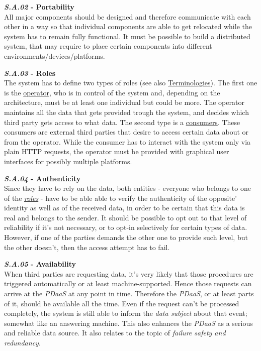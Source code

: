 \documentclass[12pt,english,a4paper,titlepage,cleardoublepage=empty,dottedtoc]{report}
\begin{document}
\textbf{\emph{\protect\hypertarget{sa02}{}{S.A.02}} - Portability}\\
All major components should be designed and therefore communicate with
each other in a way so that individual components are able to get
relocated while the system has to remain fully functional. It must be
possible to build a distributed system, that may require to place
certain components into different environments/devices/platforms.

\textbf{\emph{\protect\hypertarget{sa03}{}{S.A.03}} - Roles}\\
The system has to define two types of roles (see also
\protect\hyperlink{terminologies}{Terminologies}). The first one is the
\protect\hyperlink{terminologies--operator}{operator}, who is in control
of the system and, depending on the architecture, must be at least one
individual but could be more. The operator maintains all the data that
gets provided trough the system, and decides which third party gets
access to what data. The second type is a
\protect\hyperlink{terminologies--consumer}{consumers}. These consumers
are external third parties that desire to access certain data about or
from the operator. While the consumer has to interact with the system
only via plain HTTP requests, the operator must be provided with
graphical user interfaces for possibly multiple platforms.

\textbf{\emph{\protect\hypertarget{sa04}{}{S.A.04}} - Authenticity}\\
Since they have to rely on the data, both entities - everyone who
belongs to one of the \emph{\protect\hyperlink{sa03}{roles}} - have to
be able able to verify the authenticity of the opposite' identity as
well as of the received data, in order to be certain that this data is
real and belongs to the sender. It should be possible to opt out to that
level of reliability if it's not necessary, or to opt-in selectively for
certain types of data. However, if one of the parties demands the other
one to provide such level, but the other doesn't, then the access
attempt has to fail.

\textbf{\emph{\protect\hypertarget{sa05}{}{S.A.05}} - Availability}\\
When third parties are requesting data, it's very likely that those
procedures are triggered automatically or at least machine-supported.
Hence those requests can arrive at the \emph{PDaaS} at any point in
time. Therefore the \emph{PDaaS}, or at least parts of it, should be
available all the time. Even if the request can't be processed
completely, the system is still able to inform the \emph{data subject}
about that event; somewhat like an answering machine. This also enhances
the \emph{PDaaS} as a serious and reliable data source. It also relates
to the topic of \emph{failure safety and redundancy}.
\end{document}

